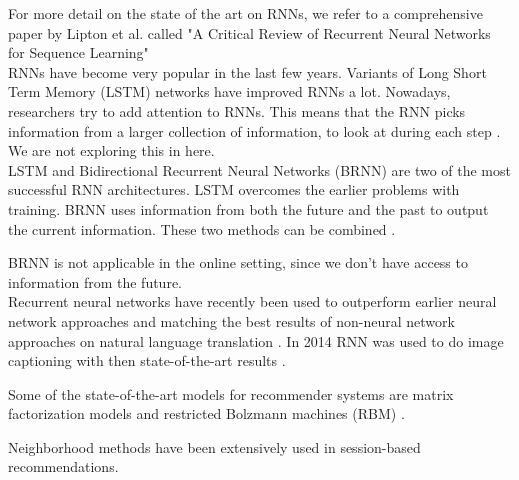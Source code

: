 For more detail on the state of the art on RNNs, we refer to a comprehensive paper by Lipton et al. called "A Critical Review of Recurrent Neural Networks
for Sequence Learning" \cite{DBLP:journals/corr/Lipton15}\\

RNNs have become very popular in the last few years. Variants of Long Short Term Memory (LSTM) networks have improved RNNs a lot. Nowadays, researchers try to add attention to RNNs. This means that the RNN picks information from a larger collection of information, to look at during each step \cite{COLAH:understanding-lstm}. We are not exploring this in here.\\

LSTM and Bidirectional Recurrent Neural Networks (BRNN) are two of the most successful RNN architectures.
LSTM overcomes the earlier problems with training. BRNN uses information from both the future and the past to output the current information. These two methods can be combined \cite{DBLP:journals/corr/Lipton15}.

BRNN is not applicable in the online setting, since we don't have access to information from the future.\\


Recurrent neural networks have recently been used to outperform earlier neural network approaches and matching the best results of non-neural network approaches on natural language translation \cite{DBLP:journals/corr/SutskeverVL14}. In 2014 RNN was used to do image captioning with then state-of-the-art results \cite{DBLP:journals/corr/MaoXYWY14a}.

Some of the state-of-the-art models for recommender systems are matrix factorization models and restricted Bolzmann machines (RBM) \cite{AGS:implicit-recommender-systems}.

Neighborhood methods have been extensively used in session-based recommendations.

